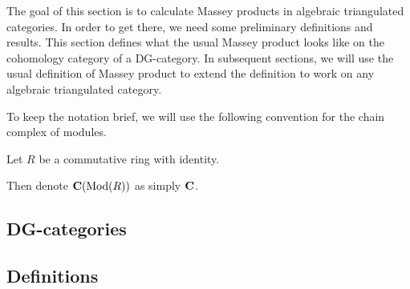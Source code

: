 The goal of this section is to calculate Massey products in algebraic triangulated categories. In order to get there, we need some preliminary definitions and results. This section defines what the usual Massey product looks like on the cohomology category of a DG-category. In subsequent sections, we will use the usual definition of Massey product to extend the definition to work on any algebraic triangulated category.

To keep the notation brief, we will use the following convention for the chain complex of modules.
\begin{notation}
    Let \( R \) be a commutative ring with identity.

    Then denote \( \operatorname{\mathbf{C}}(\operatorname{Mod}(R)) \) as simply \( \operatorname{\mathbf{C}} \).
\end{notation}

\subsection{DG-categories}


\subsection{Definitions}

